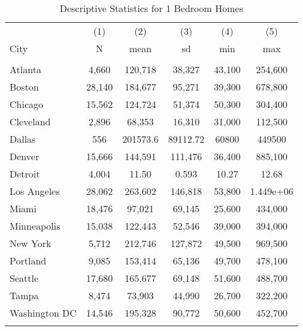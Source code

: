 \begin{table}
\begin{centering}
\caption{Descriptive Statistics for 1 Bedroom Homes}\label{tab:1bed}
\begin{tabular}{lccccc} \hline
 & (1) & (2) & (3) & (4) & (5) \\
City & N & mean & sd & min & max \\ \hline
 &  &  &  &  &  \\
 Atlanta            & 4,660 & 120,718 & 38,327 & 43,100 & 254,600 \\
 Boston             & 28,140 & 184,677 & 95,271 & 39,300 & 678,800 \\
 Chicago            & 15,562 & 124,724 & 51,374 & 50,300 & 304,400 \\
 Cleveland          & 2,896 & 68,353 & 16,310 & 31,000 & 112,500 \\
 Dallas& 556        &  201573.6  &  89112.72   &   60800  &   449500\\
 Denver             & 15,666 & 144,591 & 111,476 & 36,400 & 885,100 \\
 Detroit            & 4,004 & 11.50 & 0.593 & 10.27 & 12.68 \\
 Los Angeles        & 28,062 & 263,602 & 146,818 & 53,800 & 1.449e+06 \\
 Miami & 18,476     & 97,021 & 69,145 & 25,600 & 434,000 \\
 Minneapolis        & 15,038 & 122,443 & 52,546 & 39,000 & 394,000 \\
 New York           & 5,712 & 212,746 & 127,872 & 49,500 & 969,500 \\
 Portland           & 9,085 & 153,414 & 65,136 & 49,700 & 478,100 \\
 Seattle            & 17,680 & 165,677 & 69,148 & 51,600 & 488,700 \\
 Tampa              & 8,474 & 73,903 & 44,990 & 26,700 & 322,200 \\
 Washington DC      & 14,546 & 195,328 & 90,772 & 50,600 & 452,700 \\


  &  &  &  &  &  \\ \hline
\end{tabular}
\end{centering}
\end{table}

